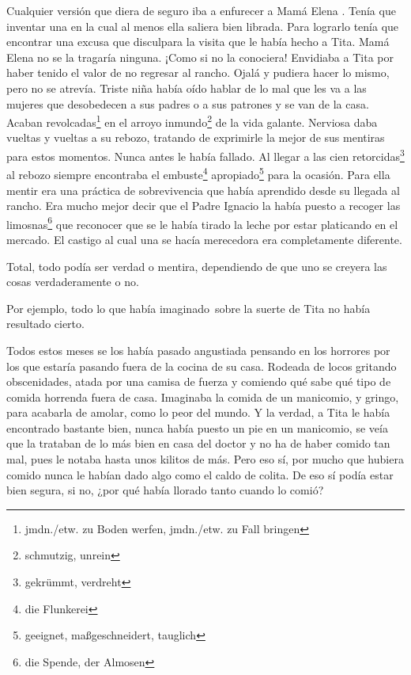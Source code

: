 Cualquier versión que diera de seguro iba a enfurecer a Mamá Elena .
Tenía que inventar una en la cual al menos ella saliera bien librada.
Para lograrlo tenía que encontrar una excusa que disculpara la visita
que le había hecho a Tita. Mamá Elena no se la tragaría ninguna. ¡Como
si no la conociera! Envidiaba a Tita por haber tenido el valor de no
regresar al rancho. Ojalá y pudiera hacer lo mismo, pero no se atrevía.
Triste niña había oído hablar de lo mal que les va a las mujeres que
desobedecen a sus padres o a sus patrones y se van de la casa. Acaban revolcadas\footnote{jmdn./etw. zu Boden werfen, jmdn./etw. zu Fall bringen}
en el arroyo inmundo\footnote{schmutzig, unrein} de la vida
galante. Nerviosa daba vueltas y vueltas a su rebozo, tratando de
exprimirle la mejor de sus mentiras para estos momentos. Nunca antes
le había fallado. Al llegar a las cien retorcidas\footnote{gekrümmt, verdreht}
al rebozo siempre encontraba el embuste\footnote{die Flunkerei} apropiado\footnote{geeignet, maßgeschneidert, tauglich}
para la ocasión. Para ella mentir era una práctica de sobrevivencia que
había aprendido desde su llegada al rancho. Era mucho mejor decir que
el Padre Ignacio la había puesto a recoger las limosnas\footnote{die Spende, der Almosen}
que reconocer que se le había tirado la leche por estar platicando
en el mercado. El castigo al cual una se hacía merecedora era
completamente diferente.

Total, todo podía ser verdad o mentira, dependiendo de que uno se
creyera las cosas verdaderamente o no.

Por ejemplo, todo lo que había imaginado~sobre la suerte de Tita
no había resultado cierto.

Todos estos meses se los había pasado angustiada pensando en los
horrores por los que estaría pasando fuera de la cocina de su casa.
Rodeada de locos gritando obscenidades, atada por una camisa de fuerza y
comiendo qué sabe qué tipo de comida horrenda fuera de casa. Imaginaba
la comida de un manicomio, y gringo, para acabarla de amolar, como lo
peor del mundo. Y la verdad, a Tita le había encontrado bastante bien,
nunca había puesto un pie en un manicomio, se veía que la trataban de lo
más bien en casa del doctor y no ha de haber comido tan mal, pues le
notaba hasta unos kilitos de más. Pero eso sí, por mucho que hubiera
comido nunca le habían dado algo como el caldo de colita. De eso sí
podía estar bien segura, si no, ¿por qué había llorado tanto cuando lo
comió?

